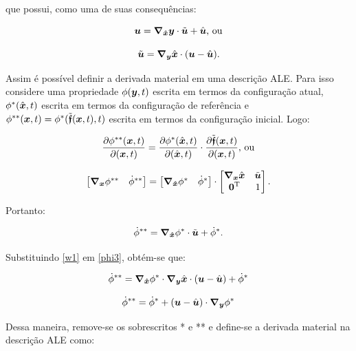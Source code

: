 \noindent que possui, como uma de suas consequências:

\begin{equation}
    \boldsymbol{u}=\boldsymbol{\nabla_{\hat{x}}}\boldsymbol{y}\cdot\tilde{\boldsymbol{u}}+\hat{\boldsymbol{u}}\text{, ou}
    \label{u1}
\end{equation}

\begin{equation}
    \tilde{\boldsymbol{u}}=\boldsymbol{\nabla_y}\hat{\boldsymbol{x}}\cdot(\boldsymbol{u}-\hat{\boldsymbol{u}})\text{.}
    \label{w1}
\end{equation}

Assim é possível definir a derivada material em uma descrição ALE. Para isso considere uma propriedade $\phi(\boldsymbol{y},t)$ escrita em termos da configuração atual, $\phi^*(\hat{\boldsymbol{x}},t)$ escrita em termos da configuração de referência e $\phi^{**}(\boldsymbol{x},t)=\phi^*(\tilde{\boldsymbol{\mathfrak{f}}}(\boldsymbol{x},t),t)$ escrita em termos da configuração inicial. Logo:

\begin{equation}
    \frac{\partial{\phi^{**}(\boldsymbol{x},t)}}{\partial{(\boldsymbol{x},t)}}=\frac{\partial{\phi^*(\hat{\boldsymbol{x}},t)}}{\partial{(\hat{\boldsymbol{x}},t)}}\cdot\frac{\partial{\tilde{\boldsymbol{\mathfrak{f}}}(\boldsymbol{x},t)}}{\partial{(\boldsymbol{x},t)}}\text{, ou}
    \label{phi1}
\end{equation}

\begin{equation}
    \begin{bmatrix}\boldsymbol{\nabla_x}\phi^{**}&\dot{\phi}^{**}\end{bmatrix}=
    \begin{bmatrix}\boldsymbol{\nabla_{\hat{x}}}\phi^{*}&\dot{\phi}^{*}\end{bmatrix}\cdot
    \begin{bmatrix}\boldsymbol{\nabla_x}\hat{\boldsymbol{x}}&\tilde{\boldsymbol{u}}\\\boldsymbol{0}^\mathrm{T}&1\end{bmatrix}
    \text{.}
    \label{phi2}
\end{equation}

\noindent Portanto:

\begin{equation}
    \dot{\phi}^{**}=\boldsymbol{\nabla_{\hat{x}}}\phi^{*}\cdot\tilde{\boldsymbol{u}}+\dot{\phi}^{*}\text{.}
    \label{phi3}
\end{equation}

Substituindo \ref{w1} em \ref{phi3}, obtém-se que:

\[\dot{\phi}^{**}=\boldsymbol{\nabla_{\hat{x}}}\phi^{*}\cdot\boldsymbol{\nabla_y}\hat{\boldsymbol{x}}\cdot(\boldsymbol{u}-\hat{\boldsymbol{u}})+\dot{\phi}^{*}\]

\[\dot{\phi}^{**}=\dot{\phi}^{*}+(\boldsymbol{u}-\hat{\boldsymbol{u}})\cdot\boldsymbol{\nabla_y}\phi^{*}\]

Dessa maneira, remove-se os sobrescritos * e ** e define-se a derivada material na descrição ALE como:

